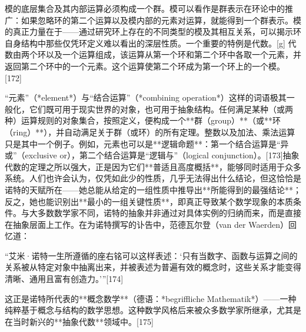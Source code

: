 模的底层集合及其内部运算必须构成一个群。模可以看作是群表示在环论中的推广：如果忽略环的第二个运算以及模内部的元素对运算，就能得到一个群表示。模的真正力量在于——通过研究环上存在的不同类型的模及其相互关系，可以揭示环自身结构中那些仅凭环定义难以看出的深层性质。一个重要的特例是代数。[g] 代数由两个环以及一个运算组成，该运算从第一个环和第二个环中各取一个元素，并返回第二个环中的一个元素。这个运算使第二个环成为第一个环上的一个模。[172]


“元素”（*element*）与“结合运算”（*combining operation*）这样的词语极其一般化，它们既可用于现实世界的对象，也可用于抽象结构。任何满足某种（或两种）运算规则的对象集合，按照定义，便构成一个**群（group）**（或**环（ring）**），并自动满足关于群（或环）的所有定理。整数以及加法、乘法运算只是其中一个例子。例如，元素也可以是**逻辑命题**：第一个结合运算是“异或”（exclusive or），第二个结合运算是“逻辑与”（logical conjunction）。[173]抽象代数的定理之所以强大，正是因为它们**普适且高度概括**，能够同时适用于众多系统。人们也许会认为，仅凭如此少的性质，几乎无法得出什么结论，但这恰恰是诺特的天赋所在——她总能从给定的一组性质中推导出**所能得到的最强结论**；反之，她也能识别出**最小的一组关键性质**，即真正导致某个数学现象的本质条件。与大多数数学家不同，诺特的抽象并非通过对具体实例的归纳而来，而是直接在抽象层面上工作。在为诺特撰写的讣告中，范德瓦尔登（van der Waerden）回忆道：

“艾米·诺特一生所遵循的座右铭可以这样表述：‘只有当数字、函数与运算之间的关系被从特定对象中抽离出来，并被表述为普遍有效的概念时，这些关系才能变得清晰、通用且富有创造力。’”[174]

这正是诺特所代表的**概念数学**（德语：*begriffliche Mathematik*）——一种纯粹基于概念与结构的数学思想。这种数学风格后来被众多数学家所继承，尤其是在当时新兴的**抽象代数**领域中。[175]
